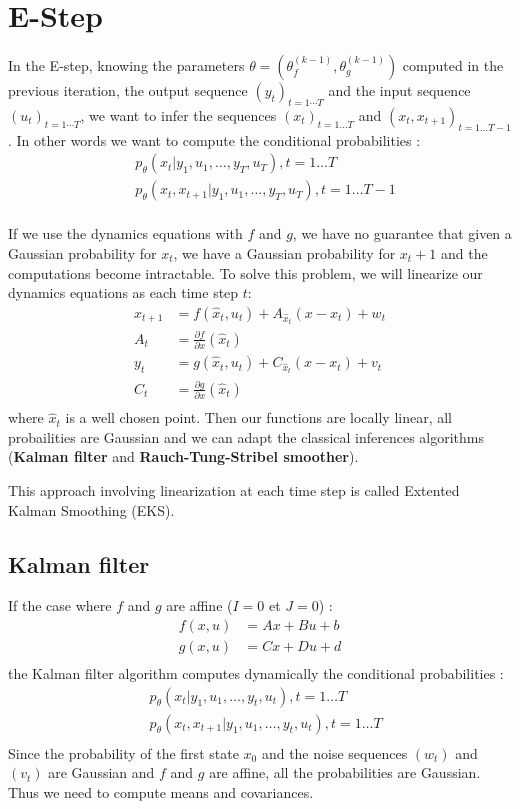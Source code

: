 \section{E-Step}

In the E-step, knowing the parameters $\theta = (\theta_f^{(k-1)}, \theta_g^{(k-1)})$ computed in the previous iteration, the output sequence $(y_t)_{t=1 \cdots T}$ and the input sequence $(u_t)_{t=1 \cdots T}$, we want to infer the sequences $(x_t)_{t=1 \ldots T}$ and $(x_t, x_{t+1})_{t=1 \ldots T-1}$.
In other words we want to compute the conditional probabilities :
\begin{align*}
  &p_{\theta}\left(x_t|y_1, u_1, \ldots, y_T, u_T \right ), t=1 \ldots T\\
  &p_{\theta}\left(x_t, x_{t+1}|y_1, u_1, \ldots, y_T, u_T \right ), t=1 \ldots T-1\\
\end{align*}

If we use the dynamics equations with $f$ and $g$, we have no guarantee that given a Gaussian probability for $x_t$, we have a Gaussian probability for $x_t+1$ and the computations become intractable.
To solve this problem, we will linearize our dynamics equations as each time step $t$:
\begin{align*}
	x_{t+1} &= f(\hat{x}_t, u_t) + A_{\hat{x}_t} (x - x_t) + w_t\\
  A_t &= \frac{\partial f}{\partial x}(\hat{x}_t)\\
	y_t &= g(\hat{x}_t, u_t) + C_{\hat{x}_t} (x - x_t) + v_t\\
  C_t &= \frac{\partial g}{\partial x}(\hat{x}_t)\\
\end{align*}
where $\hat{x}_t$ is a well chosen point.
Then our functions are locally linear, all probailities are Gaussian and we can adapt the classical inferences algorithms (\textbf{Kalman filter} and \textbf{Rauch-Tung-Stribel smoother}).

This approach involving linearization at each time step is called Extented Kalman Smoothing (EKS).

\subsection{Kalman filter}

If the case where $f$ and $g$ are affine ($I=0$ et $J=0$) :
\begin{align*}
  f(x,u) &= Ax + Bu + b\\
  g(x,u) &= Cx + Du + d\\
\end{align*}
the Kalman filter algorithm computes dynamically the conditional probabilities :
\begin{align*}
  &p_{\theta}\left(x_t|y_1, u_1, \ldots, y_t, u_t \right ), t=1 \ldots T\\
  &p_{\theta}\left(x_t, x_{t+1}|y_1, u_1, \ldots, y_t, u_t \right ), t=1 \ldots T\\
\end{align*}
Since the probability of the first state $x_0$ and the noise sequences $(w_t)$ and $(v_t)$ are Gaussian and $f$ and $g$ are affine, all the probabilities are Gaussian.
Thus we need to compute means and covariances.

